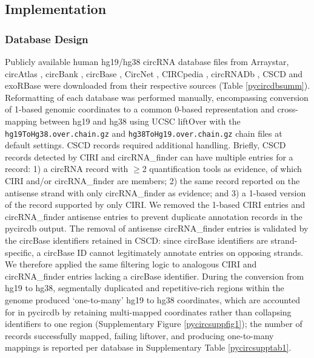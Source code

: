 \subsection{Implementation}
\subsubsection{Database Design}
Publicly available human hg19/hg38 circRNA database files from Arraystar, circAtlas \cite{circatlas}, circBank \cite{circbank}, circBase \cite{circbase}, CircNet \cite{circnet}, CIRCpedia \cite{circpedia}, circRNADb \cite{circrnadb}, CSCD \cite{CSCD2} and exoRBase \cite{exoRBase} were downloaded from their respective sources (Table \ref{pycircdbsumm}). Reformatting of each database was performed manually, encompassing conversion of 1-based genomic coordinates to a common 0-based representation and cross-mapping between hg19 and hg38 using UCSC liftOver \cite{ucscliftover} with the \texttt{hg19ToHg38.over.chain.gz} and \texttt{hg38ToHg19.over.chain.gz} chain files at default settings. CSCD records required additional handling. Briefly, CSCD records detected by CIRI and circRNA\_finder can have multiple entries for a record: 1) a circRNA record with $\geq$2 quantification tools as evidence, of which CIRI and/or circRNA\_finder are members; 2) the same record reported on the antisense strand with only circRNA\_finder as evidence; and 3) a 1-based version of the record supported by only CIRI. We removed the 1-based CIRI entries and circRNA\_finder antisense entries to prevent duplicate annotation records in the pycircdb output. The removal of antisense circRNA\_finder entries is validated by the circBase identifiers retained in CSCD: since circBase identifiers are strand-specific, a circBase ID cannot legitimately annotate entries on opposing strands. We therefore applied the same filtering logic to analogous CIRI and circRNA\_finder entries lacking a circBase identifier. During the conversion from hg19 to hg38, segmentally duplicated and repetitive-rich regions within the genome produced `one-to-many' hg19 to hg38 coordinates, which are accounted for in pycircdb by retaining multi-mapped coordinates rather than collapsing identifiers to one region (Supplementary Figure \ref{pycircsuppfig1}); the number of records successfully mapped, failing liftover, and producing one-to-many mappings is reported per database in Supplementary Table \ref{pycircsupptab1}.

